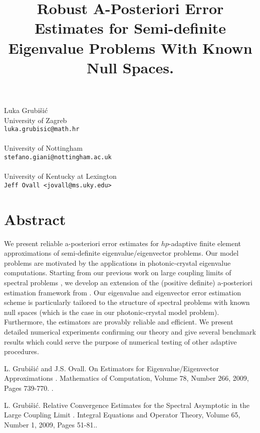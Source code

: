 \title{Robust A-Posteriori Error Estimates for Semi-definite Eigenvalue Problems With Known Null Spaces.}
 \author{} \institute{}
\maketitle
\begin{center}
{\large Luka Grubi\v{s}i\'{c}}\\
University of Zagreb\\
{\tt luka.grubisic@math.hr}
\\ \vspace{4mm}{\large Stefano Giani}\\
University of Nottingham\\
{\tt stefano.giani@nottingham.ac.uk}
\\ \vspace{4mm}{\large Jeffrey Ovall}\\
University of Kentucky at Lexington\\
{\tt Jeff Ovall <jovall@ms.uky.edu>}

\end{center}

\section*{Abstract}

We present reliable a-posteriori error estimates for $hp$-adaptive finite element approximations
of semi-definite eigenvalue/eigenvector problems. Our model problems are motivated by
the applications in photonic-crystal eigenvalue computations. Starting from our previous work on large coupling limits
of spectral problems \cite{SC}, we develop an extension of the (positive definite) a-posteriori estimation framework from \cite{LO}.
Our eigenvalue and eigenvector error estimation scheme is particularly tailored to the structure of spectral problems 
with known null spaces (which is the case in our photonic-crystal model problem). 
Furthermore, the estimators are provably reliable and efficient. We present detailed numerical experiments confirming our theory and give several benchmark results which could serve the purpose of numerical testing of other adaptive procedures.


\begin{thebibliography}{10}

{\sc L. Grubi\v{s}i\'{c} and J.S. Ovall}. {On Estimators for Eigenvalue/Eigenvector Approximations }. Mathematics of Computation, Volume 78, Number 266, 2009, Pages 739-770. .



{\sc L. Grubi\v{s}i\'{c}}. {Relative Convergence Estimates for the Spectral Asymptotic in the Large Coupling Limit }. Integral Equations and Operator Theory, Volume 65, Number 1, 2009, Pages 51-81..

\end{thebibliography}
